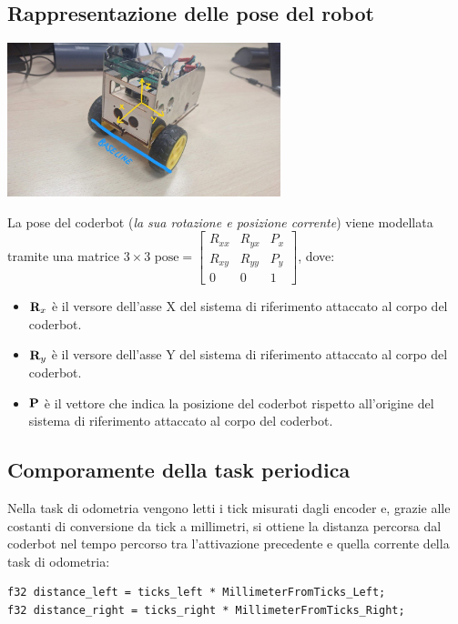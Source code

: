 \documentclass[11pt]{article}
\begin{document}
\subsection{Rappresentazione delle pose del robot}
\label{sec:org3f88f4c}
\begin{center}
\includegraphics[width=300]{./img/coderbot-graph.jpg}
\end{center}

La pose del coderbot (\emph{la sua rotazione e posizione corrente}) viene modellata tramite una matrice \(3\times3\)  \(\text{pose}=\begin{bmatrix}R_{xx}&R_{yx}&P_x\\R_{xy}&R_{yy}&P_y\\0&0&1\end{bmatrix}\), dove:
\begin{itemize}
\item \(\bold R_{x}\) è il versore dell'asse X del sistema di riferimento attaccato al corpo del coderbot.
\item \(\bold R_{y}\) è il versore dell'asse Y del sistema di riferimento attaccato al corpo del coderbot.
\item \(\bold P\) è il vettore che indica la posizione del coderbot rispetto all'origine del sistema di riferimento attaccato al corpo del coderbot.
\end{itemize}
\subsection{Comporamente della task periodica}
\label{sec:org796a791}
Nella task di odometria vengono letti i tick misurati dagli encoder e, grazie alle costanti di conversione da tick a millimetri, si ottiene la distanza percorsa dal coderbot nel tempo percorso tra l'attivazione precedente e quella corrente della task di odometria:
\begin{verbatim}
f32 distance_left = ticks_left * MillimeterFromTicks_Left;
f32 distance_right = ticks_right * MillimeterFromTicks_Right;
\end{verbatim}
\end{document}
